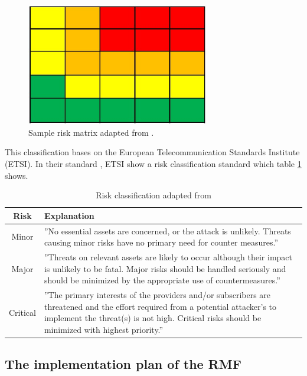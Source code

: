 \begin{figure}[ht!]
  \centering
  \includegraphics[width=8cm]{pictures/sample_matrix.jpg}
  \caption{Sample risk matrix adapted from \cite{Ivanenko2020IMPLEMENTATIONOR}.}
  \label{fig:sample_matrix}
\end{figure}

This classification bases on the European Telecommunication Standards Institute (ETSI). In their standard \cite{applications_2022}, ETSI show a risk classification standard which table \ref{tab:risk_classify} shows.

\begin{table}[h]
\centering
  \begin{tabular}{|c|p{10cm}|}
  \hline
  \rowcolor{lightgray} Risk & Explanation \\
  \hline
  Minor & ''No essential assets are concerned, or the attack is unlikely. Threats causing minor risks have no
primary need for counter measures.''  \\
  \hline
  Major & ''Threats on relevant assets are likely to occur although their impact is unlikely to be fatal. Major
risks should be handled seriously and should be minimized by the appropriate use of
countermeasures.'' \\
  \hline
  Critical & ''The primary interests of the providers and/or subscribers are threatened and the effort required
from a potential attacker's to implement the threat(s) is not high. Critical risks should be
minimized with highest priority.'' \\
  \hline
  \end{tabular}
\caption{Risk classification adapted from \cite{applications_2022}}
\label{tab:risk_classify}
\end{table}

\subsection{The implementation plan of the RMF}
\label{sec:final_design}

